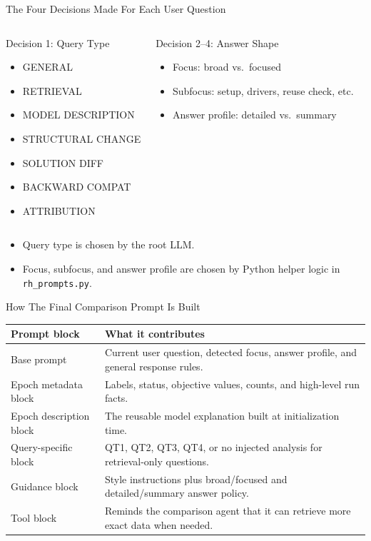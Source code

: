 \documentclass[10pt]{beamer}
\newcommand{\goodbox}[2]{
  \begin{block}{#1}
  #2
  \end{block}
}
\newcommand{\func}[1]{\texttt{#1}}
\begin{document}
\begin{frame}{The Four Decisions Made For Each User Question}
  \begin{columns}[T]
    \goodbox{Decision 1: Query Type}{
      \begin{itemize}
        \item GENERAL
        \item RETRIEVAL
        \item MODEL DESCRIPTION
        \item STRUCTURAL CHANGE
        \item SOLUTION DIFF
        \item BACKWARD COMPAT
        \item ATTRIBUTION
      \end{itemize}
    }
    \goodbox{Decision 2--4: Answer Shape}{
      \begin{itemize}
        \item Focus: broad vs.\ focused
        \item Subfocus: setup, drivers, reuse check, etc.
        \item Answer profile: detailed vs.\ summary
      \end{itemize}
    }
  \end{columns}
  \vspace{0.5em}
  \begin{itemize}
    \item Query type is chosen by the root LLM.
    \item Focus, subfocus, and answer profile are chosen by Python helper logic in \func{rh\_prompts.py}.
  \end{itemize}
\end{frame}

\begin{frame}{How The Final Comparison Prompt Is Built}
  \small
  \begin{tabularx}{\textwidth}{>{\raggedright\arraybackslash}p{} X}
    \toprule
    \textbf{Prompt block} & \textbf{What it contributes} \\
    \midrule
    Base prompt & Current user question, detected focus, answer profile, and general response rules. \\
    Epoch metadata block & Labels, status, objective values, counts, and high-level run facts. \\
    Epoch description block & The reusable model explanation built at initialization time. \\
    Query-specific block & QT1, QT2, QT3, QT4, or no injected analysis for retrieval-only questions. \\
    Guidance block & Style instructions plus broad/focused and detailed/summary answer policy. \\
    Tool block & Reminds the comparison agent that it can retrieve more exact data when needed. \\
    \bottomrule
  \end{tabularx}
\end{frame}
\end{document}
